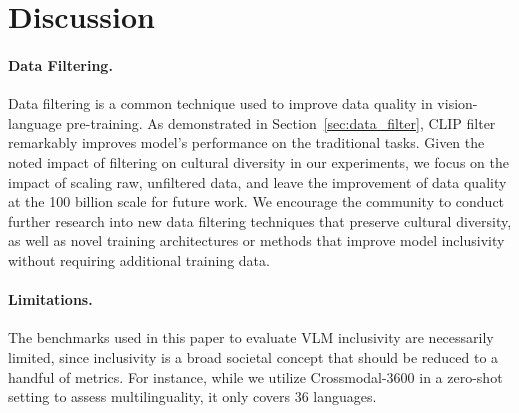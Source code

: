 \section{Discussion}

\paragraph{Data Filtering.} Data filtering is a common technique used to improve data quality in vision-language pre-training. As demonstrated in Section~\ref{sec:data_filter}, CLIP filter remarkably improves model's performance on the traditional tasks. %
Given the noted impact of filtering on cultural diversity in our experiments, we focus on the impact of scaling raw, unfiltered data, and leave the improvement of data quality at the 100 billion scale for future work.
We encourage the community to conduct further research into new data filtering techniques that preserve cultural diversity, as well as novel training architectures or methods that improve model inclusivity without requiring additional training data.

\paragraph{Limitations.} The benchmarks used in this paper to evaluate VLM inclusivity are necessarily limited, since inclusivity is a broad societal concept that should be reduced to a handful of metrics. For instance, while we utilize Crossmodal-3600 in a zero-shot setting to assess multilinguality, it only covers 36 languages. %


